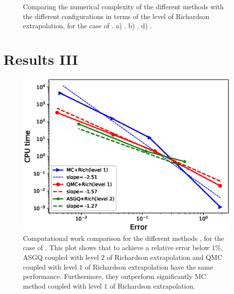 \documentclass[ima, 20pt, portrait, plainboxedsections]{sciposter}
\begin{document}
\begin{multicols}{3}
\begin{figure}
\begin{subfigure}{0.45\textwidth}
		\caption{}
	\end{subfigure}%
	\caption{Comparing the numerical complexity of the different  methods with the different configurations in terms of the level of Richardson extrapolation,  for the case of . a) . b) . d) . }
	\label{fig: Comparing the numerical complexity of the different  methods with the different configurations}
\end{figure}
\section*{Results III}

\begin{figure}[h!]
	\centering
	\includegraphics[width=0.6\linewidth]{./rBergomi_Complexity_rates/set2/error_vs_time_set2_full_comparison}
	\caption{Computational work comparison for the different methods , for the case of . This plot shows that to achieve a relative error below $1\%$, ASGQ coupled with level $2$ of Richardson extrapolation and QMC coupled with level $1$ of  Richardson extrapolation have the same performance. Furthermore, they outperform significantly MC method coupled with level $1$ of Richardson extrapolation.}	\label{fig:Complexity plot for  MISC for Case set $2$ parameters, comparison}
\end{figure}



\end{multicols}
\end{document}

